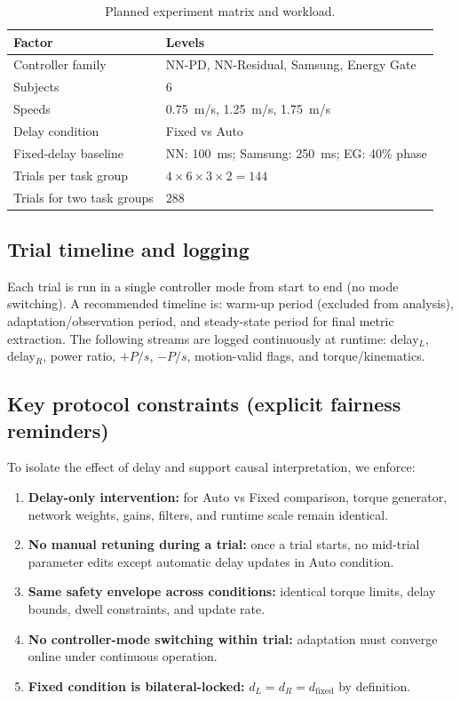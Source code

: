 \documentclass[lettersize,journal]{IEEEtran}
\begin{document}
\begin{table}[t]
\centering
\caption{Planned experiment matrix and workload.}
\label{tab:exp_matrix}
\begin{tabularx}{\columnwidth}{lX}
\toprule
Factor & Levels \\
\midrule
Controller family & NN-PD, NN-Residual, Samsung, Energy Gate \\
Subjects & 6 \\
Speeds & \SI{0.75}{m/s}, \SI{1.25}{m/s}, \SI{1.75}{m/s} \\
Delay condition & Fixed vs Auto \\
Fixed-delay baseline & NN: \SI{100}{ms}; Samsung: \SI{250}{ms}; EG: 40\% phase \\
\midrule
Trials per task group & $4 \times 6 \times 3 \times 2 = 144$ \\
Trials for two task groups & $288$ \\
\bottomrule
\end{tabularx}
\end{table}

\subsection{Trial timeline and logging}
Each trial is run in a single controller mode from start to end (no mode switching). A recommended timeline is: warm-up period (excluded from analysis), adaptation/observation period, and steady-state period for final metric extraction. The following streams are logged continuously at runtime: delay$_L$, delay$_R$, power ratio, $+P/s$, $-P/s$, motion-valid flags, and torque/kinematics.

\subsection{Key protocol constraints (explicit fairness reminders)}
To isolate the effect of delay and support causal interpretation, we enforce:
\begin{enumerate}
\item \textbf{Delay-only intervention:} for Auto vs Fixed comparison, torque generator, network weights, gains, filters, and runtime scale remain identical.
\item \textbf{No manual retuning during a trial:} once a trial starts, no mid-trial parameter edits except automatic delay updates in Auto condition.
\item \textbf{Same safety envelope across conditions:} identical torque limits, delay bounds, dwell constraints, and update rate.
\item \textbf{No controller-mode switching within trial:} adaptation must converge online under continuous operation.
\item \textbf{Fixed condition is bilateral-locked:} $d_L=d_R=d_{\text{fixed}}$ by definition.
\end{enumerate}
\end{document}
